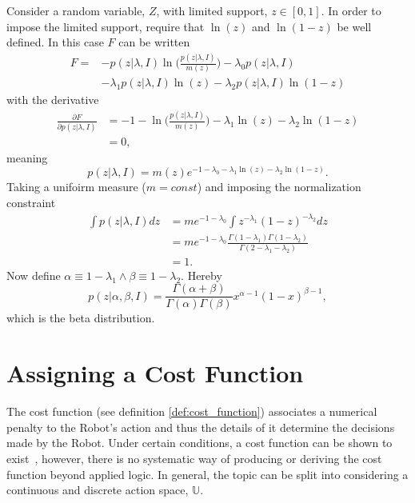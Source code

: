 	\begin{example}
		Consider a random variable, $Z$, with limited support, $z\in [0,1]$. In order to impose the limited support, require that $\ln(z)$ and $\ln(1-z)$ be well defined. In this case $F$ can be written\label{ex:beta}
		\begin{equation}
			\begin{split}
				F =& -p(z|\lambda,I)\ln\bigg(\frac{p(z|\lambda,I)}{m(z)}\bigg)-\lambda_0p(z|\lambda,I)\\
				&-\lambda_1p(z|\lambda,I)\ln(z)-\lambda_2p(z|\lambda,I)\ln(1-z)
			\end{split}
		\end{equation}
		with the derivative
		\begin{equation}
			\begin{split}
				\frac{\partial F}{\partial p(z|\lambda,I)} &= -1-\ln\bigg(\frac{p(z|\lambda,I)}{m(z)}\bigg)-\lambda_1\ln(z)-\lambda_2\ln(1-z)\\
				&=0,
			\end{split}
		\end{equation}
		meaning
		\begin{equation}
			p(z|\lambda,I)=m(z)e^{-1-\lambda_0-\lambda_1\ln(z)-\lambda_2\ln(1-z)}.
		\end{equation}
		Taking a unifoirm measure ($m= const$) and imposing the normalization constraint
		\begin{equation}
			\begin{split}
				\int p(z|\lambda,I) dz &= me^{-1-\lambda_0}\int z^{-\lambda_1}(1-z)^{-\lambda_2}dz\\
				&= me^{-1-\lambda_0}\frac{\Gamma(1-\lambda_1)\Gamma(1-\lambda_2)}{\Gamma(2-\lambda_1-\lambda_2)}\\
				&=1.
			\end{split}
		\end{equation}
		Now define $\alpha \equiv 1-\lambda_1\wedge \beta \equiv 1-\lambda_2$. Hereby
		\begin{equation}
			p(z|\alpha,\beta,I) = \frac{\Gamma(\alpha+\beta)}{\Gamma(\alpha)\Gamma(\beta)}x^{\alpha-1}(1-x)^{\beta-1},
		\end{equation}
		which is the beta distribution. 
	\end{example}
	
	\section{Assigning a Cost Function}
	\label{sec:assing_cost}
	The cost function (see definition \ref{def:cost_function}) associates a numerical penalty to the Robot's action and thus the details of it determine the decisions made by the Robot. Under certain conditions, a cost function can be shown to exist~\citep{lavalle2006planning}, however, there is no systematic way of producing or deriving the cost function beyond applied logic. In general, the topic can be split into considering a continuous and discrete action space, $\mathbb{U}$. 	
	
